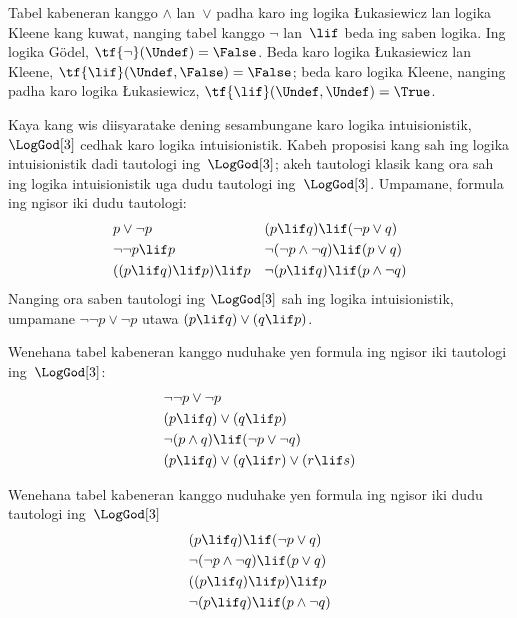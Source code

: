 \documentclass[../../../include/open-logic-section]{subfiles}
\begin{document}
Tabel kabeneran kanggo $\land$ lan~$\lor$ padha karo
ing logika \L ukasiewicz lan logika Kleene kang kuwat, nanging
tabel kanggo $\lnot$ lan~$\lif$ beda ing saben logika. Ing logika
G\"odel, $\tf{\lnot}(\Undef) = \False$. Beda karo logika
\L ukasiewicz lan Kleene, $\tf{\lif}(\Undef, \False) = \False$;
beda karo logika Kleene, nanging padha karo logika \L ukasiewicz,
$\tf{\lif}(\Undef, \Undef) = \True$.

Kaya kang wis diisyaratake dening sesambungane karo logika
intuisionistik, $\LogGod[3]$ cedhak karo logika intuisionistik.
Kabeh proposisi kang sah ing logika intuisionistik dadi tautologi
ing~$\LogGod[3]$; akeh tautologi klasik kang ora sah ing logika
intuisionistik uga dudu tautologi ing~$\LogGod[3]$. Umpamane,
formula ing ngisor iki dudu tautologi:
\begin{align*}
  & p \lor \lnot p && (p \lif q) \lif (\lnot p \lor q) \\
  & \lnot\lnot p \lif p && \lnot(\lnot p \land \lnot q) \lif (p \lor q) \\
  & ((p \lif q) \lif p) \lif p && \lnot(p \lif q) \lif (p \land \lnot q)
\end{align*}
Nanging ora saben tautologi ing $\LogGod[3]$ sah ing logika
intuisionistik, umpamane $\lnot\lnot p \lor \lnot p$ utawa $(p
\lif q) \lor (q \lif p)$.

\begin{prob}
  Wenehana tabel kabeneran kanggo nuduhake yen formula ing ngisor
  iki tautologi ing~$\LogGod[3]$:
  \begin{align*}
    & \lnot\lnot p \lor \lnot p\\
    & (p \lif q) \lor (q \lif p) \\
    & \lnot(p \land q) \lif (\lnot p \lor \lnot q) \\
    & (p \lif q) \lor (q \lif r) \lor (r \lif s)
  \end{align*}
\end{prob}

\begin{prob}
  Wenehana tabel kabeneran kanggo nuduhake yen formula ing ngisor
  iki dudu tautologi ing~$\LogGod[3]$
  \begin{align*}
    & (p \lif q) \lif (\lnot p \lor q) \\
    & \lnot(\lnot p \land \lnot q) \lif (p \lor q) \\
    & ((p \lif q) \lif p) \lif p \\
    & \lnot(p \lif q) \lif (p \land \lnot q)
  \end{align*}
\end{prob}
\end{document}
